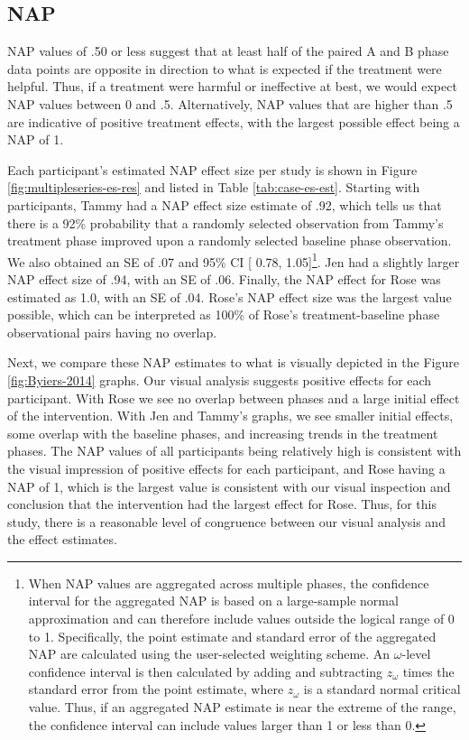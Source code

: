 \documentclass[
]{book}
\begin{document}
\hypertarget{nap}{%
\subsection{NAP}\label{nap}}

NAP values of .50 or less suggest that at least half of the paired A and B phase data points are opposite in direction to what is expected if the treatment were helpful. Thus, if a treatment were harmful or ineffective at best, we would expect NAP values between 0 and .5. Alternatively, NAP values that are higher than .5 are indicative of positive treatment effects, with the largest possible effect being a NAP of 1.

Each participant's estimated NAP effect size per study is shown in Figure \ref{fig:multipleseries-es-res} and listed in Table \ref{tab:case-es-est}. Starting with \citet{Byiers2014} participants, Tammy had a NAP effect size estimate of .92, which tells us that there is a 92\% probability that a randomly selected observation from Tammy's treatment phase improved upon a randomly selected baseline phase observation. We also obtained an SE of .07 and 95\% CI {[} 0.78, 1.05{]}\footnote{When NAP values are aggregated across multiple phases, the confidence interval for the aggregated NAP is based on a large-sample normal approximation and can therefore include values outside the logical range of 0 to 1. Specifically, the point estimate and standard error of the aggregated NAP are calculated using the user-selected weighting scheme. An \(\omega\)-level confidence interval is then calculated by adding and subtracting \(z_\omega\) times the standard error from the point estimate, where \(z_\omega\) is a standard normal critical value. Thus, if an aggregated NAP estimate is near the extreme of the range, the confidence interval can include values larger than 1 or less than 0.}. Jen had a slightly larger NAP effect size of .94, with an SE of .06. Finally, the NAP effect for Rose was estimated as 1.0, with an SE of .04. Rose's NAP effect size was the largest value possible, which can be interpreted as 100\% of Rose's treatment-baseline phase observational pairs having no overlap.

Next, we compare these NAP estimates to what is visually depicted in the Figure \ref{fig:Byiers-2014} graphs. Our visual analysis suggests positive effects for each participant. With Rose we see no overlap between phases and a large initial effect of the intervention. With Jen and Tammy's graphs, we see smaller initial effects, some overlap with the baseline phases, and increasing trends in the treatment phases. The NAP values of all participants being relatively high is consistent with the visual impression of positive effects for each participant, and Rose having a NAP of 1, which is the largest value is consistent with our visual inspection and conclusion that the intervention had the largest effect for Rose. Thus, for this study, there is a reasonable level of congruence between our visual analysis and the effect estimates.
\end{document}
